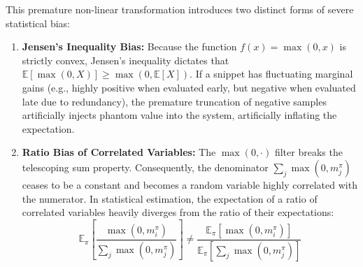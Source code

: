 \documentclass{article}
\begin{document}
This premature non-linear transformation introduces two distinct forms of severe statistical bias:
\begin{enumerate}
    \item \textbf{Jensen's Inequality Bias:} Because the function $f(x) = \max(0, x)$ is strictly convex, Jensen's inequality dictates that $\mathbb{E}[\max(0, X)] \ge \max(0, \mathbb{E}[X])$. If a snippet has fluctuating marginal gains (e.g., highly positive when evaluated early, but negative when evaluated late due to redundancy), the premature truncation of negative samples artificially injects phantom value into the system, artificially inflating the expectation.
    \item \textbf{Ratio Bias of Correlated Variables:} The $\max(0, \cdot)$ filter breaks the telescoping sum property. Consequently, the denominator $\sum_j \max(0, m_j^\pi)$ ceases to be a constant and becomes a random variable highly correlated with the numerator. In statistical estimation, the expectation of a ratio of correlated variables heavily diverges from the ratio of their expectations:
    $$ \mathbb{E}_{\pi} \left[ \frac{\max(0, m_i^\pi)}{\sum_j \max(0, m_j^\pi)} \right] \neq \frac{\mathbb{E}_{\pi}[\max(0, m_i^\pi)]}{\mathbb{E}_{\pi}\left[\sum_j \max(0, m_j^\pi)\right]} $$
\end{enumerate}
\end{document}
